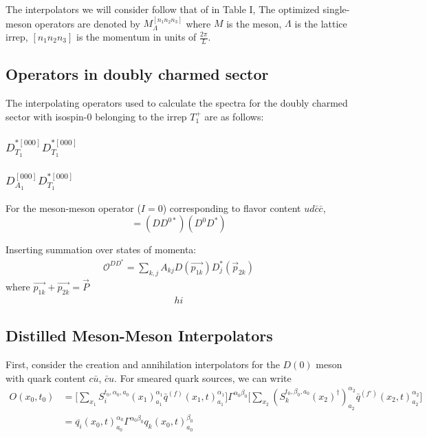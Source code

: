 The interpolators we will consider follow that of \cite{Padmanath_2022} in Table I, 
The optimized single-meson operators are denoted by $M^{[n_1n_2n_3]}_{\Lambda}$ where $M$ is the meson, $\Lambda$ is the lattice irrep, $[n_1n_2n_3]$ is the momentum in units of $\frac{2\pi}{L}$.  \cite{Cheung_2017}

\subsection{Operators in doubly charmed sector}
The interpolating operators used to calculate the spectra for the doubly charmed sector with isospin-0 belonging to the irrep $T_1^+$ are as follows:
\subsubsection*{$D^{*[000]}_{T_1}D^{*[000]}_{T_1}$}



\subsubsection{$D^{[000]}_{A_1}D^{*[000]}_{T_1}$}
For the meson-meson operator ($I=0$) corresponding to flavor content $ud\bar{c}\bar{c}$,
    \begin{equation}
    [(M_1M_2^*)(M_2M_1^*)] = (DD^{0*})(D^0D^*)
    \end{equation}

Inserting summation over states of momenta:
\begin{align}
    \mathcal{O}^{DD^*} = \sum_{k,j} A_{kj} D(\vec{p_{1k}})D_j^*(\vec{p}_{2k}) 
\end{align} where $\vec{p_{1k}} + \vec{p_{2k}} = \vec{P}$
\begin{align}
hi
\end{align}


\subsection{Distilled Meson-Meson Interpolators}

First, consider the creation and annihilation interpolators for the \(D(0)\) meson with quark content \(c\bar{u}\), \(\bar{c}u\). For smeared quark sources, we can write 
\begin{align}
    O(x_0,t_0) &= \Bigg[\sum_{x_1} S_i^{t_0,\alpha_0,a_0}(x_1)^{\alpha_1}_{a_1}\bar{q}^{(f)}(x_1,t)^{\alpha_1}_{a_1}\Bigg] \Gamma^{\alpha_0\beta_0} \Bigg[\sum_{x_2} (S_k^{t_0,\beta_0,a_0}(x_2)^\dagger)^{\alpha_2}_{a_2}\bar{q}^{(f')}(x_2,t)^{\alpha_2}_{a_2}\Bigg] \\
    &= \overline{q_i}(x_0, t)^{\alpha_0}_{a_0} \Gamma^{\alpha_0\beta_0} q_k(x_0,t)^{\beta_0}_{a_0}
\end{align}

